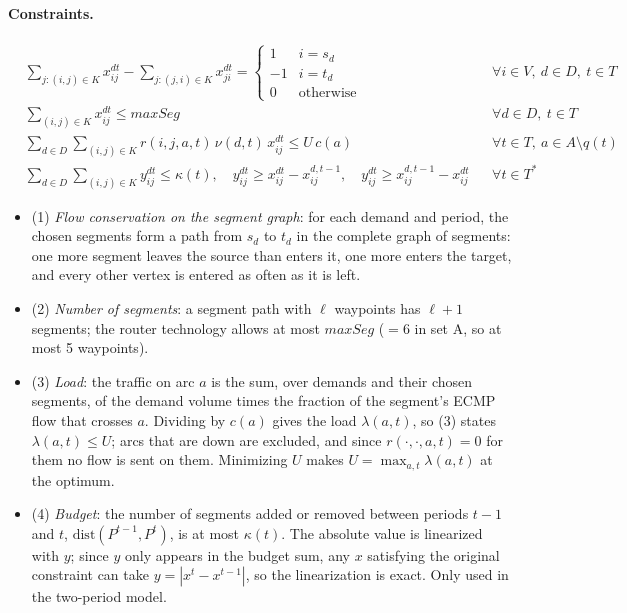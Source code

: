 \documentclass[11pt,a4paper]{article}
\begin{document}
\paragraph{Constraints.}
\begin{align}
&\sum_{j:(i,j)\in K} x^{dt}_{ij}-\sum_{j:(j,i)\in K} x^{dt}_{ji}=
\begin{cases}1 & i=s_d\\-1 & i=t_d\\0&\text{otherwise}\end{cases}
&& \forall i\in V,\ d\in D,\ t\in T \tag{1}\\
&\sum_{(i,j)\in K} x^{dt}_{ij}\leq maxSeg && \forall d\in D,\ t\in T \tag{2}\\
&\sum_{d\in D}\sum_{(i,j)\in K} r(i,j,a,t)\,\nu(d,t)\,x^{dt}_{ij}\leq U\,c(a) && \forall t\in T,\ a\in A\setminus q(t) \tag{3}\\
&\sum_{d\in D}\sum_{(i,j)\in K} y^{dt}_{ij}\leq\kappa(t),\quad
 y^{dt}_{ij}\geq x^{dt}_{ij}-x^{d,t-1}_{ij},\quad y^{dt}_{ij}\geq x^{d,t-1}_{ij}-x^{dt}_{ij} && \forall t\in T^*\tag{4}
\end{align}
\begin{itemize}
\item (1) \emph{Flow conservation on the segment graph}: for each demand and period, the chosen segments
form a path from $s_d$ to $t_d$ in the complete graph of segments: one more segment leaves the source than
enters it, one more enters the target, and every other vertex is entered as often as it is left.
\item (2) \emph{Number of segments}: a segment path with $\ell$ waypoints has $\ell+1$ segments; the
router technology allows at most $maxSeg$ ($=6$ in set A, so at most 5 waypoints).
\item (3) \emph{Load}: the traffic on arc $a$ is the sum, over demands and their chosen segments, of the
demand volume times the fraction of the segment's ECMP flow that crosses $a$. Dividing by $c(a)$ gives the
load $\lambda(a,t)$, so (3) states $\lambda(a,t)\le U$; arcs that are down are excluded, and since $r(\cdot,\cdot,a,t)=0$
for them no flow is sent on them. Minimizing $U$ makes $U=\max_{a,t}\lambda(a,t)$ at the optimum.
\item (4) \emph{Budget}: the number of segments added or removed between periods $t-1$ and $t$,
$\mathrm{dist}(P^{t-1},P^t)$, is at most $\kappa(t)$. The absolute value is linearized with $y$; since
$y$ only appears in the budget sum, any $x$ satisfying the original constraint can take
$y=|x^t-x^{t-1}|$, so the linearization is exact. Only used in the two-period model.
\end{itemize}
\end{document}
